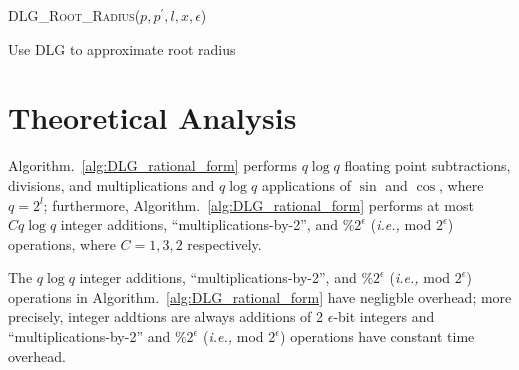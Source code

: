 \documentclass[sigconf]{acmart}
\begin{document}
\begin{algorithm}
\caption{\textsc{DLG\_Root\_Radius}($p,p^\prime,l,x, \epsilon$)}
\label{alg:DLG_Root_Radius}
\begin{algorithmic}
\STATE Use DLG to approximate root radius
\end{algorithmic}
\end{algorithm}



\section{Theoretical Analysis}\label{sec:the_ana}
\begin{theorem}
Algorithm.~\ref{alg:DLG_rational_form} performs $q \log q$ floating point subtractions, divisions, and multiplications and $q \log q$ applications of $\sin$ and $\cos$, where $q = 2^l$; furthermore, Algorithm.~\ref{alg:DLG_rational_form} performs at most $Cq \log q$  integer additions, ``multiplications-by-2'', and $ \%2^\epsilon $ (\emph{i.e.,} mod $ 2^\epsilon $) operations, where $C=1,3,2$ respectively.
\end{theorem}

\begin{theorem}
The $q \log q$  integer additions, ``multiplications-by-2'', and $ \%2^\epsilon $ (\emph{i.e.,} mod $ 2^\epsilon $) operations in Algorithm.~\ref{alg:DLG_rational_form} have negligble overhead; more precisely, integer addtions are always additions of 2 $\epsilon$-bit integers and ``multiplications-by-2'' and $ \%2^\epsilon $ (\emph{i.e.,} mod $ 2^\epsilon $) operations have constant time overhead.
\end{theorem}
\end{document}
